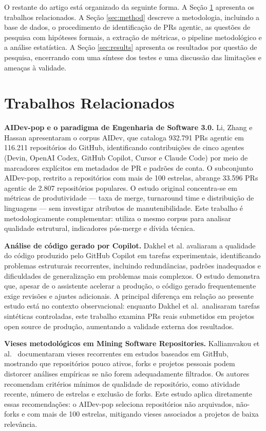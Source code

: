 \documentclass[12pt]{article}
\begin{document}
O restante do artigo está organizado da seguinte forma. A Seção
\ref{sec:related} apresenta os trabalhos relacionados. A Seção
\ref{sec:method} descreve a metodologia, incluindo a base de dados,
o procedimento de identificação de PRs agentic, as questões de pesquisa
com hipóteses formais, a extração de métricas, o pipeline metodológico e
a análise estatística. A Seção \ref{sec:results} apresenta os resultados
por questão de pesquisa, encerrando com uma síntese dos testes e uma
discussão das limitações e ameaças à validade.


\section{Trabalhos Relacionados}
\label{sec:related}

\textbf{AIDev-pop e o paradigma de Engenharia de Software 3.0.} Li, Zhang
e Hassan \cite{li:25} apresentaram o corpus AIDev, que cataloga 932.791
PRs agentic em 116.211 repositórios do GitHub, identificando contribuições
de cinco agentes (Devin, OpenAI Codex, GitHub Copilot, Cursor e Claude
Code) por meio de marcadores explícitos em metadados de PR e padrões de
conta. O subconjunto AIDev-pop, restrito a repositórios com mais de 100
estrelas, abrange 33.596 PRs agentic de 2.807 repositórios populares. O
estudo original concentra-se em métricas de produtividade --- taxa de
merge, turnaround time e distribuição de linguagens --- sem investigar
atributos de manutenibilidade. Este trabalho é metodologicamente
complementar: utiliza o mesmo corpus para analisar qualidade estrutural,
indicadores pós-merge e dívida técnica.

\textbf{Análise de código gerado por Copilot.} Dakhel et al.
\cite{dakhel:23} avaliaram a qualidade do código produzido pelo GitHub
Copilot em tarefas experimentais, identificando problemas estruturais
recorrentes, incluindo redundâncias, padrões inadequados e dificuldades de
generalização em problemas mais complexos. O estudo demonstra que, apesar
de o assistente acelerar a produção, o código gerado frequentemente exige
revisões e ajustes adicionais. A principal diferença em relação ao presente
estudo está no contexto observacional: enquanto Dakhel et al.\ analisaram
tarefas sintéticas controladas, este trabalho examina PRs reais submetidos
em projetos open source de produção, aumentando a validade externa dos
resultados.

\textbf{Vieses metodológicos em Mining Software Repositories.}
Kalliamvakou et al.\ \cite{kalliamvakou:14} documentaram vieses recorrentes
em estudos baseados em GitHub, mostrando que repositórios pouco ativos,
forks e projetos pessoais podem distorcer análises empíricas se não forem
adequadamente filtrados. Os autores recomendam critérios mínimos de
qualidade de repositório, como atividade recente, número de estrelas e
exclusão de forks. Este estudo aplica diretamente essas recomendações: o
AIDev-pop seleciona repositórios não arquivados, não-forks e com mais de
100 estrelas, mitigando vieses associados a projetos de baixa relevância.
\end{document}
